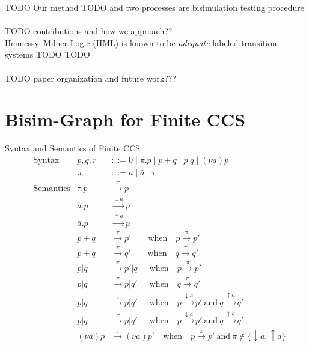 \documentclass{llncs}
\begin{document}
TODO Our method TODO
and 
two processes are
bisimulation testing procedure


\paragraph{} TODO contributions and how we approach??\\
Hennessy--Milner Logic (HML) is known to be \emph{adequate}
labeled transition systems TODO TODO

\paragraph{} TODO paper organization and future work???

\section{Bisim-Graph for Finite CCS} \label{sec:ccs}

Syntax and Semantics of Finite CCS
\begin{align*}
&\text{Syntax} &
p,q,r &::= 0 \mid \pi.p \mid p + q \mid p|q \mid (\nu a)p \\ &&
\pi &::= a \mid \bar{a} \mid \tau
\\
&\text{Semantics} &
\tau.p &\xrightarrow{\tau} p \\ &&
a.p &\xrightarrow{\downarrow a} p \\ &&
\bar{a}.p &\xrightarrow{\uparrow a} p \\ &&
p+q &\xrightarrow{\pi} p' \qquad\text{when}\quad p \xrightarrow{\pi} p' \\ &&
p+q &\xrightarrow{\pi} q' \qquad\text{when}\quad q \xrightarrow{\pi} q' \\ &&
p|q &\xrightarrow{\pi} p'|q ~~\quad\text{when}\quad p \xrightarrow{\pi} p' \\ &&
p|q &\xrightarrow{\pi} p|q' ~~\quad\text{when}\quad q \xrightarrow{\pi} q' \\ &&
p|q &\xrightarrow{\tau} p|q' ~~\quad\text{when}\quad
  p \xrightarrow{\downarrow a} p' ~\text{and}~
  q \xrightarrow{\uparrow a} q' \\ &&
p|q &\xrightarrow{\tau} p|q' ~~\quad\text{when}\quad
  p \xrightarrow{\downarrow a} p' ~\text{and}~
  q \xrightarrow{\uparrow a} q' \\ &&
(\nu a)p &\xrightarrow{\tau} (\nu a)p' \quad\text{when}\quad
  p \xrightarrow{\pi} p' ~\text{and}~ \pi \notin \{\downarrow a, \uparrow a\}
\end{align*}
\end{document}
